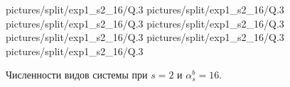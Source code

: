 \begin{figure}[H]
    \centering
       {pictures/split/exp1_s2_16/Q}{.3}
      {pictures/split/exp1_s2_16/Q}{.3}
      {pictures/split/exp1_s2_16/Q}{.3}
      {pictures/split/exp1_s2_16/Q}{.3}
      {pictures/split/exp1_s2_16/Q}{.3}
      {pictures/split/exp1_s2_16/Q}{.3}
      {pictures/split/exp1_s2_16/Q}{.3}
\caption{Численности видов системы при \(s=2\) и \(\alpha^b_s = 16\).}  \label{fig:split_exp1_s2_16}
\end{figure}

